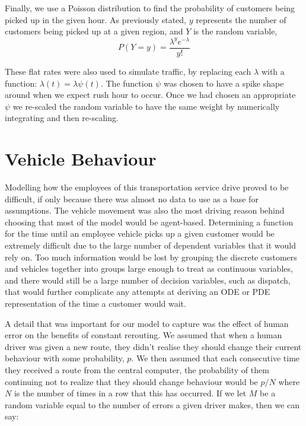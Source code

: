 \documentclass[Proceedings]{ascelike}
\begin{document}
Finally, we use a Poisson distribution to find the probability of customers being picked up in the given hour. As previously stated, $y$ represents the number of customers being picked up at a given region, and $Y$ is the random variable,
\begin{equation}
    P(Y = y) = \frac{\lambda^y e^{-\lambda}}{y!}
\end{equation}

These flat rates were also used to simulate traffic, by replacing each \( \lambda \) with a function: \( \lambda(t) =
\lambda \psi(t) \). The function \( \psi \) was chosen to have a spike shape around when we expect rush hour to occur.
Once we had chosen an appropriate \( \psi \) we re-scaled the random variable to have the same weight by numerically
integrating and then re-scaling.

\section*{Vehicle Behaviour}

Modelling how the employees of this transportation service drive proved to be difficult, if only because there was
almost no data to use as a base for assumptions. The vehicle movement was also the most driving reason behind
choosing that most of the model would be agent-based. Determining a function for the time until an employee vehicle
picks up a given customer would be extremely difficult due to the large number of dependent variables that it would
rely on. Too much information would be lost by grouping the discrete customers and vehicles together into groups
large enough to treat as continuous variables, and there would still be a large number of decision variables, such
as dispatch, that would further complicate any attempts at deriving an ODE or PDE representation of the time a
customer would wait.

A detail that was important for our model to capture was the effect of human error on the benefits of constant
rerouting. We assumed that when a human driver was given a new route, they didn't realise they should change
their current behaviour with some probability, \( p \). We then assumed that each consecutive time they received
a route from the central computer, the probability of them continuing not to realize that they should change
behaviour would be \( p / N \) where \( N \) is the number of times in a row that this has occurred. If we let
\( M \) be a random variable equal to the number of errors a given driver makes, then we can say:
\end{document}

